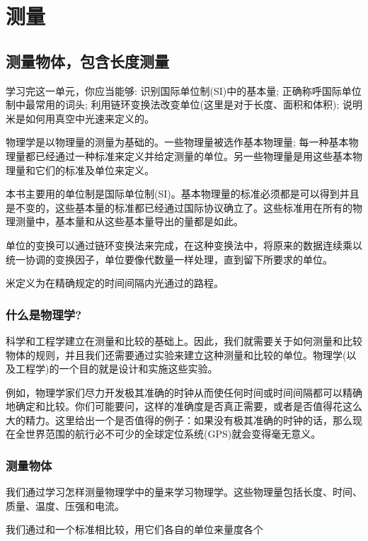 \chapter{测量}





\section{测量物体，包含长度测量}

\begin{Point*}
	学习完这一单元，你应当能够: 识别国际单位制(SI)中的基本量; 正确称呼国际单位制中最常用的词头; 利用链环变换法改变单位(这里是对于长度、面积和体积); 说明米是如何用真空中光速来定义的。
\end{Point*}


\begin{Case*}
物理学是以物理量的测量为基础的。一些物理量被选作基本物理量; 每一种基本物理量都已经通过一种标准来定义并给定测量的单位。另一些物理量是用这些基本物理量和它们的标准及单位来定义。

本书主要用的单位制是国际单位制(SI)。基本物理量的标准必须都是可以得到并且是不变的，这些基本量的标准都已经通过国际协议确立了。这些标准用在所有的物理测量中，基本量和从这些基本量导出的量都是如此。

单位的变换可以通过链环变换法来完成，在这种变换法中，将原来的数据连续乘以统一协调的变换因子，单位要像代数量一样处理，直到留下所要求的单位。

米定义为在精确规定的时间间隔内光通过的路程。
\end{Case*}



\begin{Paracol}
	\subsection{什么是物理学?}
	
	科学和工程学建立在测量和比较的基础上。因此，我们就需要关于如何测量和比较物体的规则，并且我们还需要通过实验来建立这种测量和比较的单位。物理学(以及工程学)的一个目的就是设计和实施这些实验。
	
	例如，物理学家们尽力开发极其准确的时钟从而使任何时间或时间间隔都可以精确地确定和比较。你们可能要问，这样的准确度是否真正需要，或者是否值得花这么大的精力。这里给出一个是否值得的例子：如果没有极其准确的时钟的话，那么现在全世界范围的航行必不可少的全球定位系统(GPS)就会变得毫无意义。
	
	\subsection{测量物体}
	
	我们通过学习怎样测量物理学中的量来学习物理学。这些物理量包括长度、时间、质量、温度、压强和电流。
	
	我们通过和一个标准相比较，用它们各自的单位来量度各个
	
	
	
	
	
\end{Paracol}

